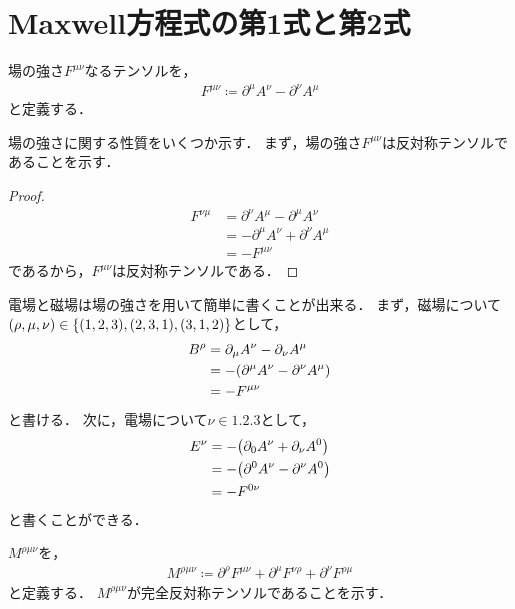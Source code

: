 \documentclass{report}
\begin{document}
  \section{Maxwell方程式の第1式と第2式}
    場の強さ$F^{\mu\nu}$なるテンソルを，
    \begin{align}
      F^{\mu\nu} \coloneqq \partial^{\mu}A^{\nu} - \partial^{\nu}A^{\mu}
    \end{align}
    と定義する．
    \par
    場の強さに関する性質をいくつか示す．
    まず，場の強さ$F^{\mu\nu}$は反対称テンソルであることを示す．
    \begin{proof}
      \begin{align}
        F^{\nu\mu} &= \partial^{\nu}A^{\mu} - \partial^{\mu}A^{\nu} \\ 
        &= -\partial^{\mu}A^{\nu} + \partial^{\nu}A^{\mu} \\ 
        &= -F^{\mu\nu}
      \end{align}
      であるから，$F^{\mu\nu}$は反対称テンソルである．
    \end{proof}
    電場と磁場は場の強さを用いて簡単に書くことが出来る．
    まず，磁場について$(\rho, \mu, \nu) \in \qty{(1, 2, 3), (2, 3, 1), (3, 1, 2)}$として，
    \begin{align}
      B^{\rho} &= \partial_{\mu}A^{\nu} - \partial_{\nu}A^{\mu} \\ 
      &= -\qty(\partial^{\mu}A^{\nu} - \partial^{\nu}A^{\mu}) \\ 
      &= -F^{\mu\nu} \label{b-field-strength}
    \end{align}
    と書ける．
    次に，電場について$\nu \in \qty{1, 2, 3}$として，
    \begin{align}
      E^{\nu} &= -\qty(\partial_0A^{\nu} + \partial_{\nu}A^0) \\ 
      &= -\qty(\partial^0A^{\nu} - \partial^{\nu}A^0) \\ 
      &= -F^{0\nu} \label{e-field-strength}
    \end{align}
    と書くことができる．
    \par
    $M^{\rho\mu\nu}$を，
    \begin{align}
      M^{\rho\mu\nu} \coloneqq \partial^{\rho}F^{\mu\nu} + \partial^{\mu}F^{\nu\rho} + \partial^{\nu}F^{\rho\mu}
    \end{align}
    と定義する．
    $M^{\rho\mu\nu}$が完全反対称テンソルであることを示す．
\end{document}

